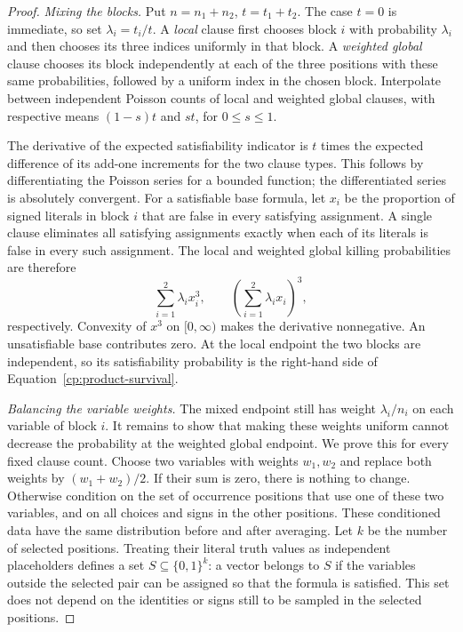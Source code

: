 \begin{proof}
\emph{Mixing the blocks.}
Put $n=n_1+n_2$, $t=t_1+t_2$. The case $t=0$ is immediate, so set
$\lambda_i=t_i/t$. A \emph{local} clause first chooses block $i$ with
probability $\lambda_i$ and then chooses its three indices uniformly in
that block. A \emph{weighted global} clause chooses its block independently
at each of the three positions with these same probabilities, followed by
a uniform index in the chosen block. Interpolate between independent
Poisson counts of local and weighted global clauses, with respective means
$(1-s)t$ and $st$, for $0\le s\le1$.

The derivative of the expected satisfiability indicator is $t$ times the
expected difference of its add-one increments for the two clause types.
This follows by differentiating the Poisson series for a bounded function;
the differentiated series is absolutely convergent. For a satisfiable
base formula, let $x_i$ be the proportion of signed literals in block $i$
that are false in every satisfying assignment. A single clause eliminates
all satisfying assignments exactly when each of its literals is false
in every such assignment. The local and weighted global killing
probabilities are therefore
\[
 \sum_{i=1}^2\lambda_i x_i^3,
 \qquad \left(\sum_{i=1}^2\lambda_i x_i\right)^3,
\]
respectively. Convexity of $x^3$ on $[0,\infty)$ makes the derivative
nonnegative. An unsatisfiable base contributes zero. At the local endpoint
the two blocks are independent, so its satisfiability probability is the
right-hand side of Equation~\eqref{cp:product-survival}.

\emph{Balancing the variable weights.}
The mixed endpoint still has weight $\lambda_i/n_i$ on each variable
of block $i$. It remains to show that making these weights uniform cannot
decrease the probability at the weighted global endpoint. We prove this
for every fixed clause count. Choose two variables with weights $w_1,w_2$
and replace both weights by $(w_1+w_2)/2$. If their sum is zero, there is
nothing to change. Otherwise condition on the set of occurrence positions
that use one of these two variables, and on all choices and signs in the
other positions. These conditioned data have the same distribution before
and after averaging. Let $k$ be the number of selected positions. Treating
their literal truth values as independent placeholders defines a set
$S\subseteq\{0,1\}^k$: a vector belongs to $S$ if the variables outside
the selected pair can be assigned so that the formula is satisfied.
This set does not depend on the identities or signs still to be sampled
in the selected positions.


\end{proof}
